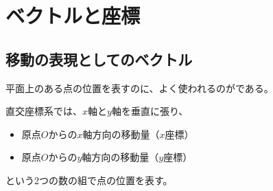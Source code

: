 \documentclass[../../imaging-math]{subfiles}
\begin{document}
\section{ベクトルと座標}

\subsection{移動の表現としてのベクトル}

平面上のある点の位置を表すのに、よく使われるのがである。

直交座標系では、$x$軸と$y$軸を垂直に張り、
\begin{itemize}
  \item 原点$O$からの$x$軸方向の移動量（$x$座標）
  \item 原点$O$からの$y$軸方向の移動量（$y$座標）
\end{itemize}
という2つの数の組で点の位置を表す。
\end{document}
